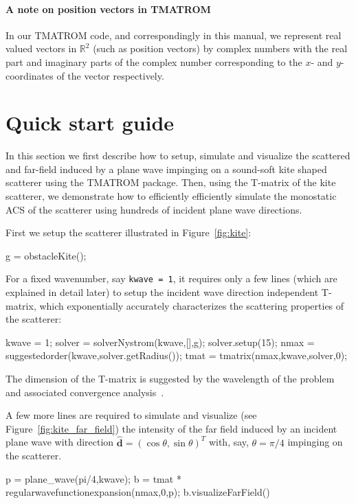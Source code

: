 \documentclass[12pt,letterpaper,final]{article}
\newcommand{\dd}{\boldsymbol{d}}
\newcommand{\hdd}{\widehat{\dd}}
\newcommand{\bbR}{\mathbb{R}}
\begin{document}
\paragraph{A note on position vectors in TMATROM}

In our TMATROM code, and correspondingly in this manual,
we represent real valued vectors in $\bbR^2$ (such as position vectors) by 
complex numbers with the real part and imaginary parts of the complex number
corresponding
to the $x$- and $y$-coordinates of the vector respectively.

\section{Quick start guide}\label{sec:start}

In this section we first describe how to setup, simulate and visualize the scattered and far-field induced by  a plane wave impinging on a sound-soft kite shaped scatterer using the TMATROM package. 
Then, using the T-matrix of the kite scatterer, 
we demonstrate how to efficiently efficiently simulate  the monostatic ACS of the scatterer 
using hundreds of incident plane wave directions. 

First we setup the scatterer illustrated in Figure~\ref{fig:kite}:
\begin{matlab}
g = obstacleKite();
\end{matlab}

For a fixed wavenumber, say {\tt kwave = 1}, it requires only a few lines
(which are explained in detail later) to 
setup the incident wave direction independent T-matrix,
which exponentially accurately characterizes
the scattering properties of the scatterer:
\begin{matlab}
kwave = 1;
solver = solverNystrom(kwave,[],g);
solver.setup(15);
nmax = suggestedorder(kwave,solver.getRadius());
tmat = tmatrix(nmax,kwave,solver,0);
\end{matlab}
The dimension of the T-matrix is suggested by the wavelength 
of the problem and associated 
convergence analysis~\cite{ghh:tmatrix}.

A few more lines are required to simulate and visualize (see Figure~\ref{fig:kite_far_field}) the intensity of the far field 
induced by an incident plane wave with
direction $\hdd = (\cos \theta, \sin \theta)^T$ with, say,  $\theta = \pi/4$
impinging on the scatterer.
\begin{matlab}
p = plane_wave(pi/4,kwave);
b = tmat * regularwavefunctionexpansion(nmax,0,p);
b.visualizeFarField()
\end{matlab}
\end{document}
